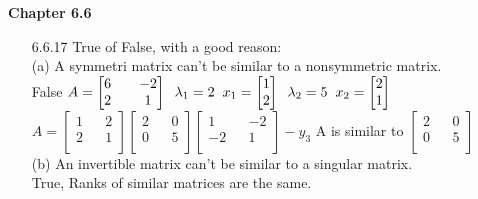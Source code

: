 \documentclass[10pt,twoside,reqno]{article}
\begin{document}
\vspace{5mm}
\textbf{Chapter 6.6}
\begin{enumerate}
\item[6.6.17] True of False, with a good reason:\\
(a) A symmetri  matrix can't be similar to a nonsymmetric matrix.\\
False 
$
$$
A =
\begin{bmatrix}
6 && -2\\
2 && 1\\
\end{bmatrix}
\hspace{2mm}
\lambda_1 = 2
\hspace{2mm}
x_1 =
\begin{bmatrix}
1\\
2\\
\end{bmatrix}
\hspace{2mm}
\lambda_2 = 5
\hspace{2mm}
x_2 =
\begin{bmatrix}
2\\
1\\
\end{bmatrix}
$$
$\\
$
$$
A = 
\begin{bmatrix}
1 && 2\\
2 && 1\\
\end{bmatrix}
\begin{bmatrix}
2 && 0\\
0 && 5\\
\end{bmatrix}
\begin{bmatrix}
1 && -2\\
-2 && 1\\
\end{bmatrix}
-y_3
$$
$
A is similar to
$
$$
\begin{bmatrix}
2 && 0\\
0 && 5\\
\end{bmatrix}
$$
$\\

\vspace{3mm}
(b) An invertible matrix can't be similar to a singular matrix.\\
True, Ranks of similar matrices are the same.\\


\end{enumerate}
\end{document}
